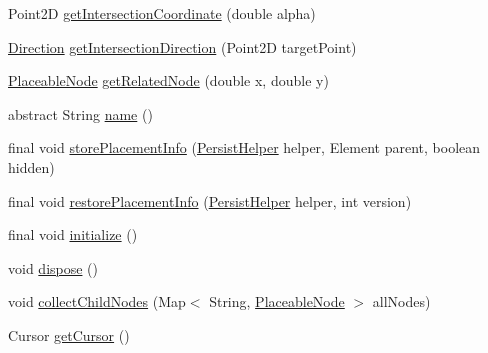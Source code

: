 \begin{DoxyCompactItemize}
\item 
Point2\-D \hyperlink{classorg_1_1tzi_1_1use_1_1gui_1_1views_1_1diagrams_1_1elements_1_1_placeable_node_add7aca373956c5363add67ab5f0d042c}{get\-Intersection\-Coordinate} (double alpha)
\item 
\hyperlink{enumorg_1_1tzi_1_1use_1_1gui_1_1views_1_1diagrams_1_1util_1_1_direction}{Direction} \hyperlink{classorg_1_1tzi_1_1use_1_1gui_1_1views_1_1diagrams_1_1elements_1_1_placeable_node_a81f0814675e81b8e5d6a095caeed0315}{get\-Intersection\-Direction} (Point2\-D target\-Point)
\item 
\hyperlink{classorg_1_1tzi_1_1use_1_1gui_1_1views_1_1diagrams_1_1elements_1_1_placeable_node}{Placeable\-Node} \hyperlink{classorg_1_1tzi_1_1use_1_1gui_1_1views_1_1diagrams_1_1elements_1_1_placeable_node_a50c7b031ecb14be683108226933be55e}{get\-Related\-Node} (double x, double y)
\item 
abstract String \hyperlink{classorg_1_1tzi_1_1use_1_1gui_1_1views_1_1diagrams_1_1elements_1_1_placeable_node_a1225d4b2ffc590d0a349daf42be306e4}{name} ()
\item 
final void \hyperlink{classorg_1_1tzi_1_1use_1_1gui_1_1views_1_1diagrams_1_1elements_1_1_placeable_node_a16a994af86ba9c0ebb2f9c533c1639d1}{store\-Placement\-Info} (\hyperlink{classorg_1_1tzi_1_1use_1_1gui_1_1util_1_1_persist_helper}{Persist\-Helper} helper, Element parent, boolean hidden)
\item 
final void \hyperlink{classorg_1_1tzi_1_1use_1_1gui_1_1views_1_1diagrams_1_1elements_1_1_placeable_node_a7e72855d46a153a5d93308bf9572b2a5}{restore\-Placement\-Info} (\hyperlink{classorg_1_1tzi_1_1use_1_1gui_1_1util_1_1_persist_helper}{Persist\-Helper} helper, int version)
\item 
final void \hyperlink{classorg_1_1tzi_1_1use_1_1gui_1_1views_1_1diagrams_1_1elements_1_1_placeable_node_acb1576e8f305e7c2257e42519b24da16}{initialize} ()
\item 
void \hyperlink{classorg_1_1tzi_1_1use_1_1gui_1_1views_1_1diagrams_1_1elements_1_1_placeable_node_a3b902c34892cc3dc5b75f80317992315}{dispose} ()
\item 
void \hyperlink{classorg_1_1tzi_1_1use_1_1gui_1_1views_1_1diagrams_1_1elements_1_1_placeable_node_ac8f76556eb7cb6f96bc8c79950793e6a}{collect\-Child\-Nodes} (Map$<$ String, \hyperlink{classorg_1_1tzi_1_1use_1_1gui_1_1views_1_1diagrams_1_1elements_1_1_placeable_node}{Placeable\-Node} $>$ all\-Nodes)
\item 
Cursor \hyperlink{classorg_1_1tzi_1_1use_1_1gui_1_1views_1_1diagrams_1_1elements_1_1_placeable_node_a680bfd7722c8d264f949bc1d0037b4c2}{get\-Cursor} ()

\end{DoxyCompactItemize}

